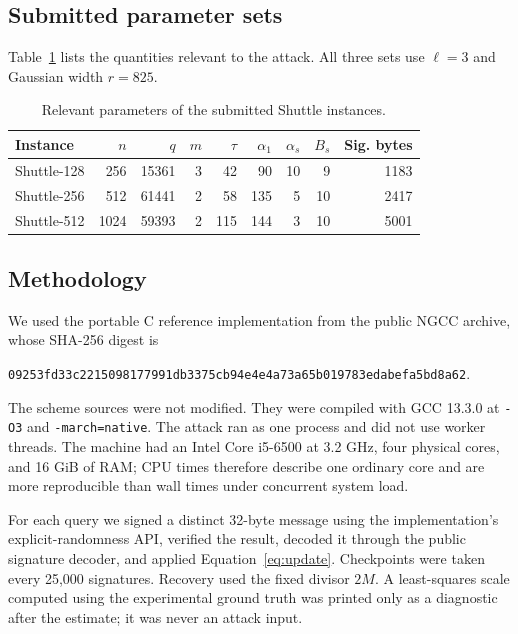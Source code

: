 \documentclass[11pt,a4paper]{article}
\begin{document}
\subsection{Submitted parameter sets}

Table~\ref{tab:params} lists the quantities relevant to the attack.  All three
sets use $\ell=3$ and Gaussian width $r=825$.

\begin{table}[ht]
\centering
\caption{Relevant parameters of the submitted Shuttle instances.}
\label{tab:params}
\small
\begin{tabular}{@{}lrrrrrrrr@{}}
\toprule
Instance & $n$ & $q$ & $m$ & $\tau$ & $\alpha_1$ & $\alpha_s$ & $B_s$ & Sig. bytes\\
\midrule
Shuttle-128 & 256  & 15361 & 3 & 42  & 90  & 10 & 9  & 1183\\
Shuttle-256 & 512  & 61441 & 2 & 58  & 135 & 5  & 10 & 2417\\
Shuttle-512 & 1024 & 59393 & 2 & 115 & 144 & 3  & 10 & 5001\\
\bottomrule
\end{tabular}
\end{table}

\subsection{Methodology}

We used the portable C reference implementation from the public NGCC archive,
whose SHA-256 digest is
\begin{center}
\scriptsize\texttt{09253fd33c2215098177991db3375cb94e4e4a73a65b019783edabefa5bd8a62}.
\end{center}
The scheme sources were not modified.  They were compiled with GCC 13.3.0 at
\texttt{-O3} and \texttt{-march=native}.  The attack ran as one process and did not use
worker threads.  The machine had an Intel Core i5-6500 at 3.2 GHz, four
physical cores, and 16 GiB of RAM; CPU times therefore describe one ordinary
core and are more reproducible than wall times under concurrent system load.

For each query we signed a distinct 32-byte message using the implementation's
explicit-randomness API, verified the result, decoded it through the public
signature decoder, and applied Equation~\eqref{eq:update}.  Checkpoints were
taken every 25,000 signatures.  Recovery used the fixed divisor $2M$.  A
least-squares scale computed using the experimental ground truth was printed
only as a diagnostic after the estimate; it was never an attack input.
\end{document}
